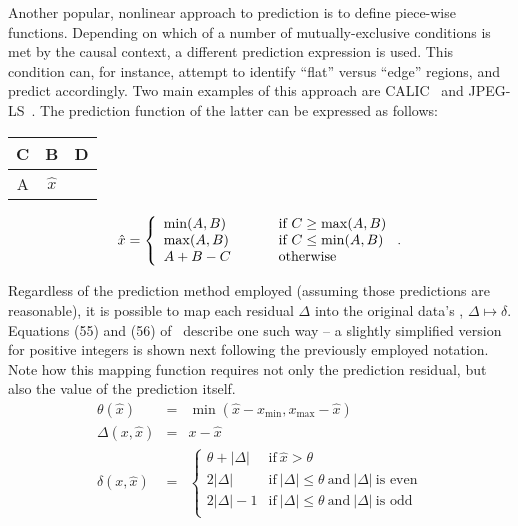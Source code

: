 Another popular, nonlinear approach to prediction is to define piece-wise functions. Depending on which of a number of mutually-exclusive conditions is met by the causal context, a different prediction expression is used. This condition can, for instance, attempt to identify ``flat'' versus ``edge'' regions, and predict accordingly. Two main examples of this approach are CALIC~\cite{wu_calic} and JPEG-LS~\cite{jpeg_ls}. The prediction function of the latter can be expressed as follows:

\begin{minipage}{0.2\linewidth}
\begin{center}
\begin{tabular}{c|c|c}
C & B & D \\
\midrule
A & $\hat{x}$\\
\end{tabular}
\end{center}
\end{minipage}%
\begin{minipage}{0.7\linewidth}
$$
\hat{x} = \left\{
\begin{array}{lp{0.5cm}l}
\min(A,B) & & \textrm{if}\ C \ge \max(A,B) \\
\max(A,B) & & \textrm{if}\ C \le \min(A,B) \\
A + B - C & & \textrm{otherwise}
\end{array}
\right..
$$
\end{minipage}

Regardless of the prediction method employed (assuming those predictions are reasonable), it is possible to map each residual $\Delta$ into the original data's , $\Delta \mapsto \delta$. Equations (55) and (56) of~\cite[\S 4.11]{ccsds123x0b2} describe one such way -- a slightly simplified version for positive integers is shown next following the previously employed notation.
Note how this mapping function requires not only the prediction residual, but also the value of the prediction itself.
%
\begin{eqnarray*}
\theta(\hat{x}) &=& \min(\hat{x} - x_\textrm{min}, x_\textrm{max} - \hat{x}) \\
\Delta(x, \hat{x}) &=& x - \hat{x} \\
\delta(x, \hat{x}) &=& \left\{
\begin{array}{ll}
\theta + |\Delta|  & \textrm{if}\ \hat{x} > \theta \\
2|\Delta| &  \textrm{if}\ |\Delta| \le \theta\ \textrm{and}\ |\Delta|\ \textrm{is even} \\
2|\Delta| -1  & \textrm{if}\ |\Delta| \le \theta\ \textrm{and}\ |\Delta|\ \textrm{is odd} \\
\end{array}
\right.
\end{eqnarray*}

